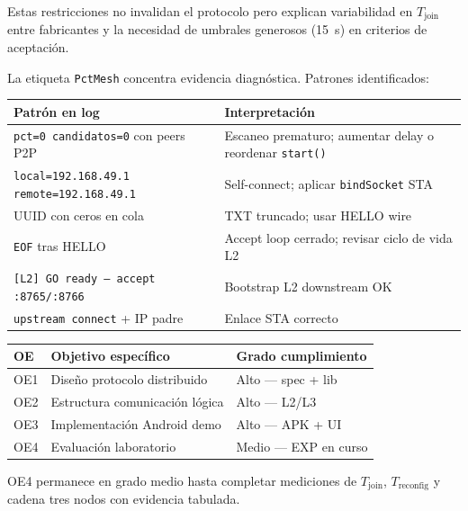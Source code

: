Estas restricciones no invalidan el protocolo pero explican variabilidad en $T_{\mathrm{join}}$ entre fabricantes y la necesidad de umbrales generosos (15~s) en criterios de aceptación.


La etiqueta \texttt{PctMesh} concentra evidencia diagnóstica. Patrones identificados:

\begin{center}
\small
\begin{tabular}{@{}p{5.5cm}p{7.5cm}@{}}
\hline
\textbf{Patrón en log} & \textbf{Interpretación} \\
\hline
\texttt{pct=0 candidatos=0} con peers P2P & Escaneo prematuro; aumentar delay o reordenar \texttt{start()} \\
\texttt{local=192.168.49.1 remote=192.168.49.1} & Self-connect; aplicar \texttt{bindSocket} STA \\
UUID con ceros en cola & TXT truncado; usar HELLO wire \\
\texttt{EOF} tras HELLO & Accept loop cerrado; revisar ciclo de vida L2 \\
\texttt{[L2] GO ready — accept :8765/:8766} & Bootstrap L2 downstream OK \\
\texttt{upstream connect} + IP padre & Enlace STA correcto \\
\hline
\end{tabular}
\end{center}


\begin{center}
\small
\begin{tabular}{@{}p{0.8cm}p{7.5cm}p{2.7cm}@{}}
\hline
\textbf{OE} & \textbf{Objetivo específico} & \textbf{Grado cumplimiento} \\
\hline
OE1 & Diseño protocolo distribuido & Alto — spec + lib \\
OE2 & Estructura comunicación lógica & Alto — L2/L3 \\
OE3 & Implementación Android demo & Alto — APK + UI \\
OE4 & Evaluación laboratorio & Medio — EXP en curso \\
\hline
\end{tabular}
\end{center}

OE4 permanece en grado medio hasta completar mediciones de $T_{\mathrm{join}}$, $T_{\mathrm{reconfig}}$ y cadena tres nodos con evidencia tabulada.

